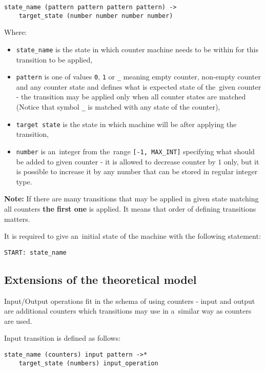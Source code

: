 \documentclass[english,shortabstract,mgr]{iithesis}
\begin{document}
\begin{verbatim}
state_name (pattern pattern pattern pattern) ->
    target_state (number number number number)
\end{verbatim}

Where:
\begin{itemize}
  \item \texttt{state\_name} is the state in which counter machine needs to be
      within for this transition to be applied,
  \item \texttt{pattern} is one of values \texttt{0}, \texttt{1} or \texttt{\_}
      meaning empty counter, non-empty counter and any counter state and defines
      what is expected state of the~given counter - the transition may be applied
      only when all counter states are matched (Notice that symbol \texttt{\_}
      is matched with any state of the counter),
  \item \texttt{target state} is the state in which machine will be after
      applying the transition,
  \item \texttt{number} is an~integer from the~range \texttt{[-1, MAX\_INT]} specifying
      what should be added to given counter - it is allowed to decrease counter
      by $1$ only, but it is possible to increase it by any number that can be stored
      in regular integer type.
\end{itemize}

\textbf{Note:} If there are many transitions that may be applied in given state
matching all counters \textbf{the first one} is applied. It means that order
of defining transitions matters.

It is required to give an~initial state of the machine with the following statement:
\begin{verbatim}
START: state_name
\end{verbatim}

\subsection {Extensions of the theoretical model}

Input/Output operations fit in the schema of using counters - input and output
are additional counters which transitions may use in a~similar way as counters are used.

Input transition is defined as follows:
\begin{verbatim}
state_name (counters) input pattern ->*
    target_state (numbers) input_operation
\end{verbatim}
\end{document}
